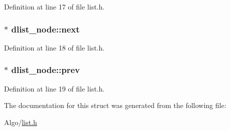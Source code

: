 Definition at line 17 of file list.\-h.

\hypertarget{structdlist__node_a446668c64b6554a885446e7766a0fca1}{
\subsubsection[{next}]{$\ast$ dlist\-\_\-node\-::next}}\label{structdlist__node_a446668c64b6554a885446e7766a0fca1}


Definition at line 18 of file list.\-h.

\hypertarget{structdlist__node_a63c2ec1d9d1d654ef30f01eb37ad5ff5}{
\subsubsection[{prev}]{$\ast$ dlist\-\_\-node\-::prev}}\label{structdlist__node_a63c2ec1d9d1d654ef30f01eb37ad5ff5}


Definition at line 19 of file list.\-h.



The documentation for this struct was generated from the following file\-:\begin{DoxyCompactItemize}
\item 
Algo/\hyperlink{list_8h}{list.\-h}\end{DoxyCompactItemize}
